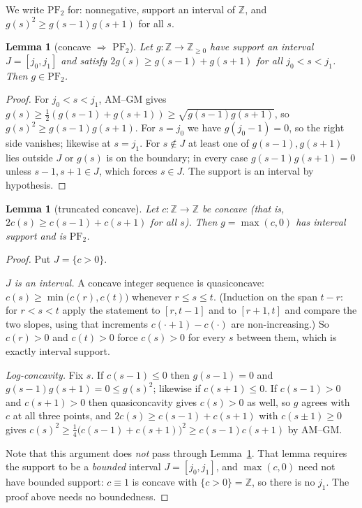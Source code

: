\documentclass[11pt]{article}
\theoremstyle{plain}
\newtheorem{lemma}[theorem]{Lemma}
\theoremstyle{definition}
\newcommand{\Z}{\mathbb{Z}}
\newcommand{\PFtwo}{\mathrm{PF}_2}
\begin{document}
We write $\PFtwo$ for: nonnegative, support an interval of $\Z$, and
$g(s)^2\ge g(s-1)g(s+1)$ for all $s$.

\begin{lemma}[concave $\Rightarrow$ $\PFtwo$]\label{lem:conc}
Let $g:\Z\to\Z_{\ge0}$ have support an interval $J=[j_0,j_1]$ and satisfy
$2g(s)\ge g(s-1)+g(s+1)$ for all $j_0<s<j_1$. Then $g\in\PFtwo$.
\end{lemma}
\begin{proof}
For $j_0<s<j_1$, AM--GM gives
$g(s)\ge\tfrac12(g(s-1)+g(s+1))\ge\sqrt{g(s-1)g(s+1)}$, so $g(s)^2\ge g(s-1)g(s+1)$.
For $s=j_0$ we have $g(j_0-1)=0$, so the right side vanishes; likewise at $s=j_1$.
For $s\notin J$ at least one of $g(s-1),g(s+1)$ lies outside $J$ or $g(s)$ is on the
boundary; in every case $g(s-1)g(s+1)=0$ unless $s-1,s+1\in J$, which forces $s\in J$.
The support is an interval by hypothesis.
\end{proof}

\begin{lemma}[truncated concave]\label{lem:trunc}
Let $c:\Z\to\Z$ be concave (that is, $2c(s)\ge c(s-1)+c(s+1)$ for all $s$). Then
$g=\max(c,0)$ has interval support and is $\PFtwo$.
\end{lemma}
\begin{proof}
Put $J=\{c>0\}$.

\emph{$J$ is an interval.} A concave integer sequence is quasiconcave:
$c(s)\ge\min\bigl(c(r),c(t)\bigr)$ whenever $r\le s\le t$. (Induction on the span $t-r$:
for $r<s<t$ apply the statement to $[r,t-1]$ and to $[r+1,t]$ and compare the two slopes,
using that increments $c(\cdot+1)-c(\cdot)$ are non-increasing.) So $c(r)>0$ and $c(t)>0$
force $c(s)>0$ for every $s$ between them, which is exactly interval support.

\emph{Log-concavity.} Fix $s$. If $c(s-1)\le0$ then $g(s-1)=0$ and
$g(s-1)g(s+1)=0\le g(s)^2$; likewise if $c(s+1)\le0$. If $c(s-1)>0$ and $c(s+1)>0$ then
quasiconcavity gives $c(s)>0$ as well, so $g$ agrees with $c$ at all three points, and
$2c(s)\ge c(s-1)+c(s+1)$ with $c(s\pm1)\ge0$ gives
$c(s)^2\ge\tfrac14\bigl(c(s-1)+c(s+1)\bigr)^2\ge c(s-1)c(s+1)$ by AM--GM.

Note that this argument does \emph{not} pass through Lemma~\ref{lem:conc}. That lemma
requires the support to be a \emph{bounded} interval $J=[j_0,j_1]$, and $\max(c,0)$ need
not have bounded support: $c\equiv1$ is concave with $\{c>0\}=\Z$, so there is no $j_1$.
The proof above needs no boundedness.
\end{proof}
\end{document}
